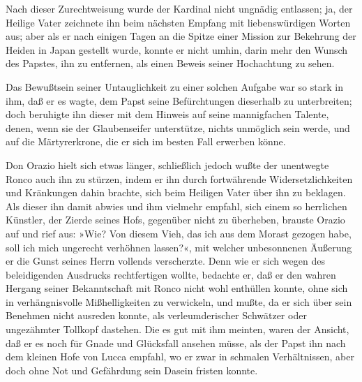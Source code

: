 Nach dieser Zurechtweisung wurde der Kardinal nicht ungnädig
entlassen; ja, der Heilige Vater zeichnete ihn beim nächsten
Empfang mit liebenswürdigen Worten aus; aber als er nach einigen
Tagen an die Spitze einer Mission zur Bekehrung der Heiden in Japan
gestellt wurde, konnte er nicht umhin, darin mehr den Wunsch des
Papstes, ihn zu entfernen, als einen Beweis seiner Hochachtung zu
sehen.

Das Bewußtsein seiner Untauglichkeit zu einer solchen Aufgabe war
so stark in ihm, daß er es wagte, dem Papst \pagenum{[90]} seine
Befürchtungen dieserhalb zu unterbreiten; doch beruhigte ihn dieser
mit dem Hinweis auf seine mannigfachen Talente, denen, wenn sie der
Glaubenseifer unterstütze, nichts unmöglich sein werde, und auf die
Märtyrerkrone, die er sich im besten Fall erwerben könne.

Don Orazio hielt sich etwas länger, schließlich jedoch wußte der
unentwegte Ronco auch ihn zu stürzen, indem er ihn durch
fortwährende Widersetzlichkeiten und Kränkungen dahin brachte, sich
beim Heiligen Vater über ihn zu beklagen. Als dieser ihn damit
abwies und ihm vielmehr empfahl, sich einem so herrlichen Künstler,
der Zierde seines Hofs, gegenüber nicht zu überheben, brauste
Orazio auf und rief aus: »Wie? Von diesem Vieh, das ich aus dem
Morast gezogen habe, soll ich mich ungerecht verhöhnen lassen?«,
mit welcher unbesonnenen Äußerung er die Gunst seines Herrn
vollends verscherzte. Denn wie er sich wegen des beleidigenden
Ausdrucks rechtfertigen wollte, bedachte er, daß er den wahren
Hergang seiner Bekanntschaft mit Ronco nicht wohl enthüllen konnte,
ohne sich in verhängnisvolle Mißhelligkeiten zu verwickeln, und
mußte, da er sich über sein Benehmen nicht ausreden konnte, als
verleumderischer Schwätzer oder ungezähmter Tollkopf dastehen. Die
es gut mit ihm meinten, waren der Ansicht, daß er es noch für Gnade
und Glücksfall ansehen müsse, als der Papst ihn nach dem kleinen
Hofe von Lucca empfahl, wo er zwar in schmalen Verhältnissen, aber
doch ohne Not und Gefährdung sein Dasein fristen konnte.

